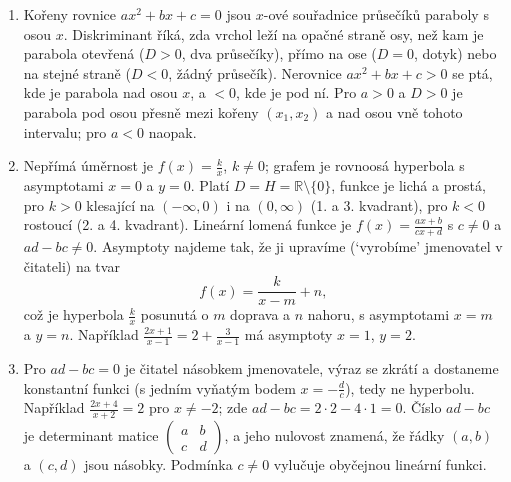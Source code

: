 \begin{enumerate}[label=\textbf{\arabic*.}, leftmargin=*, itemsep=0.8em]
  \item {}
  Kořeny rovnice $ax^2 + bx + c = 0$ jsou $x$-ové souřadnice průsečíků paraboly s osou $x$. Diskriminant říká, zda vrchol leží na opačné straně osy, než kam je parabola otevřená ($D > 0$, dva průsečíky), přímo na ose ($D = 0$, dotyk) nebo na stejné straně ($D < 0$, žádný průsečík). Nerovnice $ax^2 + bx + c > 0$ se ptá, kde je parabola nad osou $x$, a $< 0$, kde je pod ní. Pro $a > 0$ a $D > 0$ je parabola pod osou přesně mezi kořeny $(x_1, x_2)$ a nad osou vně tohoto intervalu; pro $a < 0$ naopak.

  \item {}
  Nepřímá úměrnost je $f(x) = \frac{k}{x}$, $k\neq 0$; grafem je rovnoosá hyperbola s asymptotami $x = 0$ a $y = 0$. Platí $D = H = \mathbb{R}\setminus\{0\}$, funkce je lichá a prostá, pro $k > 0$ klesající na $(-\infty, 0)$ i na $(0, \infty)$ (1. a 3. kvadrant), pro $k < 0$ rostoucí (2. a 4. kvadrant). Lineární lomená funkce je $f(x) = \frac{ax + b}{cx + d}$ s $c\neq 0$ a $ad - bc\neq 0$. Asymptoty najdeme tak, že ji upravíme (`vyrobíme' jmenovatel v čitateli) na tvar
  \begin{equation*}
    f(x) = \frac{k}{x - m} + n,
  \end{equation*}
  což je hyperbola $\frac{k}{x}$ posunutá o $m$ doprava a $n$ nahoru, s asymptotami $x = m$ a $y = n$. Například $\frac{2x + 1}{x - 1} = 2 + \frac{3}{x - 1}$ má asymptoty $x = 1$, $y = 2$. 

  \item {}
  Pro $ad - bc = 0$ je čitatel násobkem jmenovatele, výraz se zkrátí a dostaneme konstantní funkci (s jedním vyňatým bodem $x = -\frac{d}{c}$), tedy ne hyperbolu. Například $\frac{2x + 4}{x + 2} = 2$ pro $x\neq -2$; zde $ad - bc = 2\cdot 2 - 4\cdot 1 = 0$. Číslo $ad - bc$ je determinant matice $\begin{pmatrix} a & b\\ c & d \end{pmatrix}$, a jeho nulovost znamená, že řádky $(a, b)$ a $(c, d)$ jsou násobky. Podmínka $c\neq 0$ vylučuje obyčejnou lineární funkci.


\end{enumerate}
